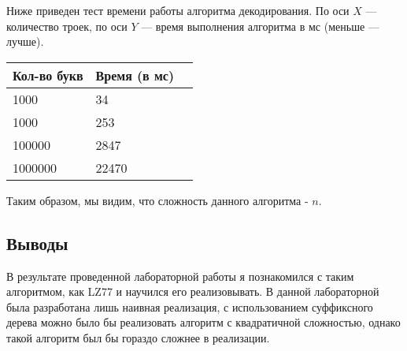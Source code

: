 \documentclass[12pt]{article}
\begin{document}
    Ниже приведен тест времени работы алгоритма декодирования. По оси $X$ — количество 
    троек, по оси $Y$ — время выполнения алгоритма в мс (меньше 
    — лучше).
    

    \begin{tabular}{ | l | l | l | }
        \hline
            Кол-во букв    & Время (в мс) \\ \hline
            1000             & 34           \\
            1000            & 253          \\
            100000           & 2847         \\
            1000000           & 22470         \\
        \hline
    \end{tabular}

    Таким образом, мы видим, что сложность данного алгоритма - $n$.

    \subsection*{Выводы}

    В результате проведенной лабораторной работы я познакомился с таким алгоритмом, как LZ77 и научился его реализовывать.
    В данной лабораторной была разработана лишь наивная реализация, с использованием суффиксного дерева можно было бы реализовать алгоритм
    с квадратичной сложностью, однако такой алгоритм был бы гораздо сложнее в реализации.
\end{document}
